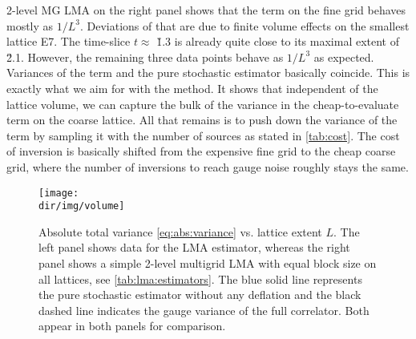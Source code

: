 2-level MG LMA on the right panel shows that the  term on the fine grid behaves mostly as $1/L^{3}$.
Deviations of that are due to finite volume effects on the smallest lattice E7.
The time-slice $t \approx $ \u{1.3}{\femto \metre} is already quite close to its maximal extent of \u{2.1}{\femto \metre}.
However, the remaining three data points behave as $1/L^{3}$ as expected.
Variances of the  term and the pure stochastic estimator basically coincide.
This is exactly what we aim for with the method.
It shows that independent of the lattice volume, we can capture the bulk of the variance in the cheap-to-evaluate  term on the coarse lattice.
All that remains is to push down the variance of the  term by sampling it with the number of sources as stated in \cref{tab:cost}.
The cost of inversion is basically shifted from the expensive fine grid to the cheap coarse grid, where the number of inversions to reach gauge noise roughly stays the same.

\begin{figure}
\centering
\texttt{[image: \\dir/img/volume]}
\caption{
Absolute total variance \cref{eq:abs:variance} vs. lattice extent $L$.
The left panel shows data for the LMA estimator, whereas the right panel shows a simple 2-level multigrid LMA with equal block size on all lattices, see \cref{tab:lma:estimators}.
The blue solid line represents the pure stochastic estimator without any deflation and the black dashed line indicates the gauge variance of the full correlator. Both appear in both panels for comparison.
\takenfull
}
\label{fig:var:vs:volume}
\end{figure}


